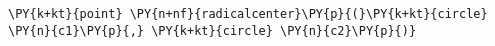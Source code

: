 \begin{Verbatim}[commandchars=\\\{\}]
    \PY{k+kt}{point} \PY{n+nf}{radicalcenter}\PY{p}{(}\PY{k+kt}{circle} \PY{n}{c1}\PY{p}{,} \PY{k+kt}{circle} \PY{n}{c2}\PY{p}{)}
\end{Verbatim}
